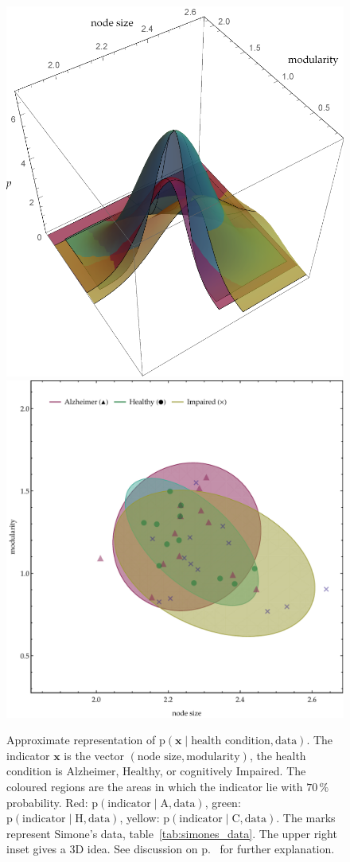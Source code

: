 \documentclass[\ifafour a4paper,12pt,\else a5paper,10pt,\fi%
onecolumn,oneside,article,%
british%
]{memoir}
\theoremstyle{remark}
\theoremstyle{innote}
\newcommand*{\pf}{\mathrm{p}}%
\renewcommand*{\|}{\mathpunct{|}}
\newcommand*{\yx}{x}
\newcommand*{\yxx}{\bm{\yx}}
\newcommand*{\data}{\text{data}}
\newcommand*{\ya}{\mathrm{A}}
\newcommand*{\yi}{\mathrm{C}}
\newcommand*{\yh}{\mathrm{H}}
\theoremstyle{plain}
\begin{document}
\begin{figure}[!h]
  \centering
\hfill\includegraphics[width=0.3\linewidth]{nodesize_vs_modularity3D.pdf}\\%
\vspace{-0.36\linewidth}  
\includegraphics[width=\linewidth]{nodesize_vs_modularity.pdf}%
\caption{Approximate representation of
  $\pf(\yxx \| \text{health condition},
  \data)$. The indicator $\yxx$ is the vector
  $(\text{node size},\text{modularity})$, the health condition is
  Alzheimer, Healthy, or cognitively Impaired. The coloured regions are the
  areas in which the indicator lie with $70\,\%$ probability. Red:
  $\pf(\text{indicator} \| \ya, \data)$, green:
  $\pf(\text{indicator} \|\yh, \data)$, yellow:
  $\pf(\text{indicator} \| \yi, \data)$. The marks represent Simone's
  data, table~\ref{tab:simones_data}. The upper right inset gives a 3D
  idea. See discussion on p.~\pageref{eq:results_discussion} for further
  explanation.}
\label{results_regions_old}
\end{figure}
\end{document}
